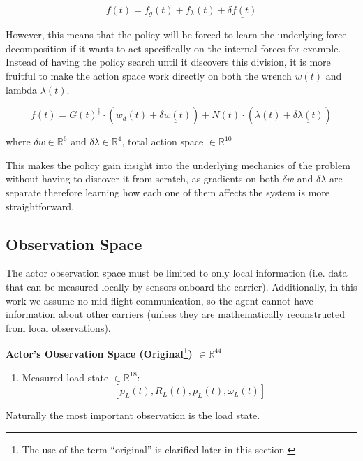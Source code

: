 \begin{equation}
  f(t) = f_g(t) + f_\lambda(t) + \underline{\delta f(t)}
  \label{eq:phase2-naive-action}
\end{equation}

However, this means that the policy will be forced to learn the
underlying force decomposition if it wants to act specifically on the
internal forces for example. Instead of having the policy search until
it discovers this division, it is more fruitful to make the action
space work directly on both the wrench $w(t)$ and lambda $\lambda(t)$.

\begin{equation}
  f(t) = G(t)^\dagger \cdot (w_d(t) + \underline{\delta w(t)}) + N(t) \cdot (\lambda(t) + \underline{\delta\lambda(t)})
  \label{eq:phase2-action-force}
\end{equation}

where $\delta w \in \mathbb{R}^6$ and $\delta \lambda \in \mathbb{R}^4$,
total action space $\in \mathbb{R}^{10}$

This makes the policy gain insight into the underlying mechanics of the
problem without having to discover it from scratch, as gradients on
both $\delta w$ and $\delta \lambda$ are separate therefore learning how
each one of them affects the system is more straightforward.

\subsection{Observation Space}

The actor observation space must be limited to only local information
(i.e. data that can be measured locally by sensors onboard the
carrier). Additionally, in this work we assume no mid-flight
communication, so the agent cannot have information about other
carriers (unless they are mathematically reconstructed from local
observations).

\newpage
\noindent\textbf{Actor's Observation Space (Original\footnote{The use of the
term “original” is clarified later in this section.}) $\in
\mathbb{R}^{44}$}

\begin{enumerate}
  \item Measured load state $\in \mathbb{R}^{18}$:
  \[
    [p_L(t), R_L(t), \dot{p}_L(t), \omega_L(t)]
  \]
\end{enumerate}

Naturally the most important observation is the load state.

